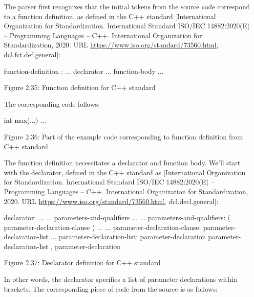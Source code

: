The parser first recognizes that the initial tokens from the source code correspond to a function definition, as defined in the C++ standard [International Organization for Standardization. International Standard ISO/IEC 14882:2020(E) – Programming Languages – C++. International Organization for Standardization, 2020. URL \url{https://www.iso.org/standard/73560.html}, dcl.fct.def.general]:

\begin{shell}
function-definition :
    ... declarator ... function-body
    ...
\end{shell}

\begin{center}
Figure 2.35: Function definition for C++ standard
\end{center}

The corresponding code follows:

\begin{cpp}
int max(...) {
  ...
}
\end{cpp}

\begin{center}
Figure 2.36: Part of the example code corresponding to function definition from C++ standard
\end{center}

The function definition necessitates a declarator and function body. We'll start with the declarator, defined in the C++ standard as [International Organization for Standardization. International Standard ISO/IEC 14882:2020(E) – Programming Languages – C++. International Organization for Standardization, 2020. URL \url{https://www.iso.org/standard/73560.html}, dcl.decl.general]:

\begin{shell}
declarator:
        ...
        ... parameters-and-qualifiers ...
...
parameters-and-qualifiers:
        ( parameter-declaration-clause ) ...
...
parameter-declaration-clause:
        parameter-declaration-list ...
parameter-declaration-list:
        parameter-declaration
        parameter-declaration-list , parameter-declaration
\end{shell}

\begin{center}
Figure 2.37: Declarator definition for C++ standard
\end{center}

In other words, the declarator specifies a list of parameter declarations within brackets. The corresponding piece of code from the source is as follows:

